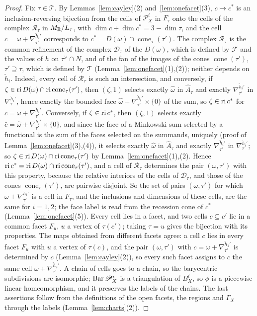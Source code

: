 \begin{proof}
Fix $\tau\in\mathcal T$. By Lemmas~\ref{lem:cayley}(2) and~\ref{lem:onefacet}(3), $c\mapsto c^*$ is an inclusion-reversing
bijection from the cells of $\mathscr P^i_X$ in $F_\tau$ onto the cells of the complex $\mathcal R_\tau$ in $M_\mathbb R/L_\tau$,
with $\dim c+\dim c^*=3-\dim\tau$, and the cell $c=\omega+\nabla^{\check h_i'}_{\tau'}$ corresponds to
$c^*=D(\omega)\cap\operatorname{cone}_\tau(\tau')$. The complex $\mathcal R_\tau$ is the common refinement of the complex
$\mathcal D_\tau$ of the $D(\omega)$, which is defined by $\mathcal F$ and the values of $h$ on $\tau^\vee\cap N$, and of the fan
of the images of the cones $\operatorname{cone}(\tau')$, $\tau'\supseteq\tau$, which is defined by $\mathcal T$
(Lemma~\ref{lem:onefacet}(1),(2)); neither depends on $\check h_i$. Indeed, every cell of $\mathcal R_\tau$ is such an
intersection, and conversely, if $\zeta\in\operatorname{ri} D(\omega)\cap\operatorname{ri}\operatorname{cone}_\tau(\tau')$, then $(\zeta,1)$ selects
exactly $\hat\omega$ in $\widehat A_\tau$ and exactly $\nabla^{\check h_i'}_{\tau'}$ in $\nabla^{\check h_i'}_\tau$, hence exactly
the bounded face $\hat\omega+\nabla^{\check h_i'}_{\tau'}\times\{0\}$ of the sum, so $\zeta\in\operatorname{ri} c^*$ for
$c=\omega+\nabla^{\check h_i'}_{\tau'}$. Conversely, if $\zeta\in\operatorname{ri} c^*$, then $(\zeta,1)$ selects exactly
$\hat c=\hat\omega+\nabla^{\check h_i'}_{\tau'}\times\{0\}$, and since the face of a Minkowski sum selected by a functional
is the sum of the faces selected on the summands, uniquely (proof of Lemma~\ref{lem:onefacet}(3),(4)), it selects exactly
$\hat\omega$ in $\widehat A_\tau$ and exactly $\nabla^{\check h_i'}_{\tau'}$ in $\nabla^{\check h_i'}_\tau$; so
$\zeta\in\operatorname{ri} D(\omega)\cap\operatorname{ri}\operatorname{cone}_\tau(\tau')$ by Lemma~\ref{lem:onefacet}(1),(2). Hence
$\operatorname{ri} c^*=\operatorname{ri} D(\omega)\cap\operatorname{ri}\operatorname{cone}_\tau(\tau')$, and a cell of $\mathcal R_\tau$ determines the pair
$(\omega,\tau')$ with this property, because the relative interiors of the cells of $\mathcal D_\tau$, and those of the
cones $\operatorname{cone}_\tau(\tau')$, are pairwise disjoint. So the set of
pairs $(\omega,\tau')$ for which $\omega+\nabla^{\check h_i'}_{\tau'}$ is a cell in $F_\tau$, and the inclusions and
dimensions of these cells, are the same for $i=1,2$; the face label is read from the recession cone of $c^*$
(Lemma~\ref{lem:onefacet}(5)). Every cell lies in a facet, and two cells $c\subseteq c'$ lie in a common facet $F_u$, $u$ a
vertex of $\tau(c')$; taking $\tau=u$ gives the bijection with its properties. The maps obtained from different facets agree: a
cell $c$ lies in every facet $F_u$ with $u$ a vertex of $\tau(c)$, and the pair $(\omega,\tau')$ with
$c=\omega+\nabla^{\check h_1'}_{\tau'}$ is determined by $c$ (Lemma~\ref{lem:cayley}(2)), so every such facet assigns to $c$ the
same cell $\omega+\nabla^{\check h_2'}_{\tau'}$. A chain of cells goes to a chain, so the
barycentric subdivisions are isomorphic; $\operatorname{Bar}\mathscr P^i_X$ is a triangulation of $B^i_X$, so $\phi$ is a piecewise linear
homeomorphism, and it preserves the labels of the chains. The last assertions follow from the definitions of the open
facets, the regions and $\Gamma_X$ through the labels (Lemma~\ref{lem:charts}(2)).
\end{proof}

